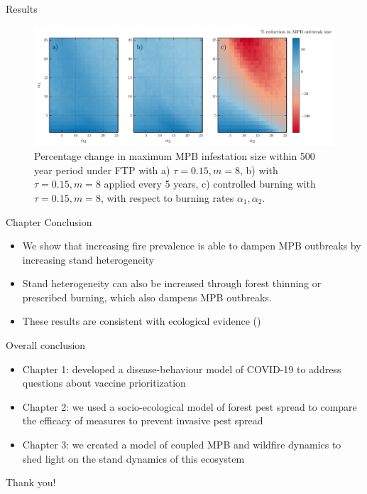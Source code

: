 \documentclass{beamer}
\begin{document}
\begin{frame}{Results}
    \begin{figure}
        \includegraphics[width=\textwidth]{mpb/a1_a2_trim_gain.pdf}
        \caption{Percentage change in maximum MPB infestation size within 500 year period under FTP with a) $\tau = 0.15, m = 8$, b) with $\tau = 0.15, m = 8$ applied every 5 years, c) controlled burning with $\tau = 0.15, m = 8$,  with respect to burning rates $\alpha_1,\alpha_2$.}
    \end{figure}
\end{frame} 


\begin{frame}{Chapter Conclusion}
    \begin{itemize}
        \item We show that increasing fire prevalence is able to dampen MPB outbreaks by increasing stand heterogeneity 
        \item Stand heterogeneity can also be increased through forest thinning or prescribed burning, which also dampens MPB outbreaks.
        \item These results are consistent with ecological evidence (\citet{seidl2016spatial,kaufmann2008status})
    \end{itemize}
\end{frame}


\begin{frame}{Overall conclusion}
    
\begin{itemize}
    \item Chapter 1: developed a disease-behaviour model of COVID-19 to address questions about vaccine prioritization
    \item Chapter 2: we used a socio-ecological model of forest pest spread to compare the efficacy of measures to prevent invasive pest spread
    \item Chapter 3: we created a model of coupled MPB and wildfire dynamics to shed light on the stand dynamics of this ecosystem 
\end{itemize}
\end{frame}


\begin{frame}{}
    \begin{center}
        \huge
        Thank you!
    \end{center}
\end{frame}

\begin{frame}[t,allowframebreaks]
    \printbibliography
\end{frame}
\end{document}
